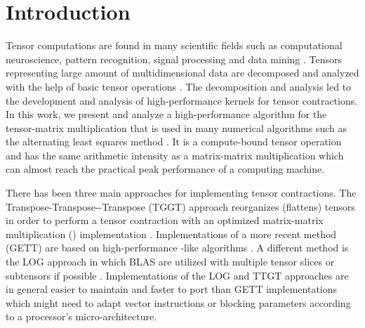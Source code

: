 \section{Introduction}
\label{sec:introduction}
Tensor computations are found in many scientific fields such as computational neuroscience, pattern recognition, signal processing and data mining \cite{karahan:2015:tensor, papalexakis:2017:tensors}.
Tensors representing large amount of multidimensional data are decomposed and analyzed with the help of basic tensor operations \cite{lee:2018:fundamental, kolda:2009:decompositions}. 
The decomposition and analysis led to the development and analysis of high-performance kernels for tensor contractions.
In this work, we present and analyze a high-performance algorithm for the tensor-matrix multiplication that is used in many numerical algorithms such as the alternating least squares method \cite{lee:2018:fundamental, kolda:2009:decompositions}.
It is a compute-bound tensor operation and has the same arithmetic intensity as a matrix-matrix multiplication which can almost reach the practical peak performance of a computing machine.

There has been three main approaches for implementing tensor contractions.
The Transpose-Transpose--Transpose (TGGT) approach reorganizes (flattens) tensors in order to perform a tensor contraction with an optimized matrix-matrix multiplication () implementation \cite{bader:2006:algorithm862, solomonik:2013:cyclops}.
Implementations of a more recent method (GETT) are based on high-performance -like algorithms \cite{springer:2018:design, matthews:2018:high, abadi:2016:tensorflow}.
A different method is the LOG approach in which BLAS are utilized with multiple tensor slices or subtensors if possible \cite{dinapoli:2014:towards.efficient.use, li:2015:input, shi:2016:tensor.contraction}.
Implementations of the LOG and TTGT approaches are in general easier to maintain and faster to port than GETT implementations which might need to adapt vector instructions or blocking parameters according to a processor's micro-architecture.

